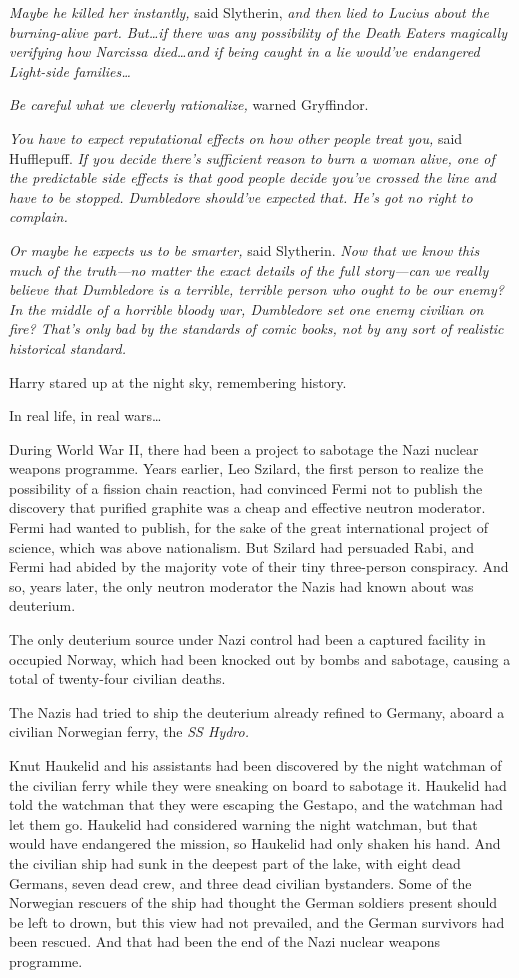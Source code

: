 \emph{Maybe he killed her instantly,} said Slytherin, \emph{and then lied to Lucius about the burning-alive part. But…if there was \emph{any} possibility of the Death Eaters magically verifying how Narcissa died…and if being caught in a lie would’ve endangered Light-side families…}

\emph{Be careful what we cleverly rationalize,} warned Gryffindor.

\emph{You have to expect reputational effects on how other people treat you,} said Hufflepuff. \emph{If you decide there’s sufficient reason to burn a woman alive, one of the predictable side effects is that good people decide you’ve crossed the line and have to be stopped. Dumbledore should’ve expected that. He’s got no right to complain.}

\emph{Or maybe he expects us to be smarter,} said Slytherin. \emph{Now that we know this much of the truth—no matter the exact details of the full story—can we really believe that Dumbledore is a terrible, terrible person who ought to be our enemy? In the middle of a horrible bloody war, Dumbledore set \emph{one} enemy civilian on fire? That’s only bad by the standards of comic books, not by any sort of realistic historical standard.}

Harry stared up at the night sky, remembering history.

In real life, in real wars…

During World War II, there had been a project to sabotage the Nazi nuclear weapons programme. Years earlier, Leo Szilard, the first person to realize the possibility of a fission chain reaction, had convinced Fermi not to publish the discovery that purified graphite was a cheap and effective neutron moderator. Fermi had wanted to publish, for the sake of the great international project of science, which was above nationalism. But Szilard had persuaded Rabi, and Fermi had abided by the majority vote of their tiny three-person conspiracy. And so, years later, the only neutron moderator the Nazis had known about was deuterium.

The only deuterium source under Nazi control had been a captured facility in occupied Norway, which had been knocked out by bombs and sabotage, causing a total of twenty-four civilian deaths.

The Nazis had tried to ship the deuterium already refined to Germany, aboard a civilian Norwegian ferry, the \emph{SS Hydro.}

Knut Haukelid and his assistants had been discovered by the night watchman of the civilian ferry while they were sneaking on board to sabotage it. Haukelid had told the watchman that they were escaping the Gestapo, and the watchman had let them go. Haukelid had considered warning the night watchman, but that would have endangered the mission, so Haukelid had only shaken his hand. And the civilian ship had sunk in the deepest part of the lake, with eight dead Germans, seven dead crew, and three dead civilian bystanders. Some of the Norwegian rescuers of the ship had thought the German soldiers present should be left to drown, but this view had not prevailed, and the German survivors had been rescued. And that had been the end of the Nazi nuclear weapons programme.

